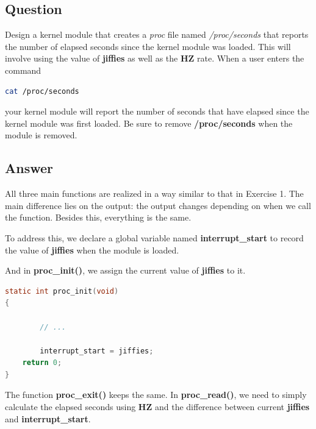 \documentclass{article}
\begin{document}
    \subsection*{Question}
    Design a kernel module that creates a \textit{proc} file named \textit{/proc/seconds}
    that reports the number of elapsed seconds since the kernel module was loaded. This will involve using the value of \textbf{jiffies} as well as the \textbf{HZ}
    rate. When a user enters the command

    \begin{lstlisting}[language=bash]
cat /proc/seconds
    \end{lstlisting}

    your kernel module will report the number of seconds that have elapsed since the kernel module was first loaded. Be sure to remove \textbf{/proc/seconds} when the module is removed.

    \subsection*{Answer}
    All three main functions are realized in a way similar to that in Exercise 1. The main difference lies on the output: the output changes depending on when we call the function. Besides this, everything is the same. 

    To address this, we declare a global variable named \textbf{interrupt\_start} to record the value of \textbf{jiffies} when the module is loaded. 

    And in \textbf{proc\_init()}, we assign the current value of \textbf{jiffies} to it. 

    \vspace{2pt}

    \begin{lstlisting}[language=c, caption={\textbf{proc\_init()}}]
static int proc_init(void)
{
        
        // ...

        interrupt_start = jiffies;
	return 0;
}
    \end{lstlisting}

    \vspace{2pt}

    The function \textbf{proc\_exit()} keeps the same. In \textbf{proc\_read()}, we need to simply calculate the elapsed seconds using \textbf{HZ} and the difference between current \textbf{jiffies} and \textbf{interrupt\_start}.

    \vspace{2pt}
\end{document}
